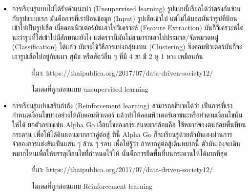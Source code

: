 \begin{itemize}[label={--}]
\item การเรียนรู้แบบไม่ได้รับคำแนะนำ (Unsupervised learning)
	      รูปแบบนี้เรียกได้ว่าตรงกันข้ามกับรูปแบบแรก มันคือการที่เราป้อนข้อมูล (Input) รูปเสือเข้าไป แต่ไม่ได้บอกมันว่ารูปที่ป้อนเข้าไปเป็นรูปเสือ เมื่อคอมพิวเตอร์มันเอาไปวิเคราะห์ (Feature Extraction) มันก็วิเคราะห์ได้นะว่ารูปที่ใส่เข้าไปมีลักษณะยังไง แต่คราวนี้มันไม่สามารถเอาไปประมวล/จัดหมวดหมู่ (Classification) ได้แล้ว มันจะใช้วิธีการแบ่งกลุ่มแทน (Clustering) ซึ่งคอมพิวเตอร์มันก็จะเอารูปเสือไปอยู่กับแมว สุนัข หรือสัตว์อื่น ๆ ที่มี 4 ขา มี 2 หู 1 หาง เหมือนกัน
				\begin{figure}[H]
					\caption{โมเดลที่ถูกสอนแบบ unsupervised learning}{ที่มา: https://thaipublica.org/2017/07/data-driven-society12/}
					\label{Fig:neural}
				\end{figure}
		\item การเรียนรู้แปบเสริมกำลัง (Reinforcement learning)
	      สามารถอธิบายได้ว่า เป็นการที่เรากำหนดเงื่อนไขบางอย่างให้กับคอมพิวเตอร์ แล้วทำให้คอมพิวเตอร์เอาชนะหรือทำตามเงื่อนไขนั้นให้ได้ ยกตัวอย่างเช่น Alpha Go เงื่อนไขของการเล่นหมากล้อมคือ ใช้หมากของตนล้อมพื้นที่บนกระดาน เพื่อให้ได้ดินแดนมากกว่าคู่ต่อสู้ ทีนี้ Alpha Go ก็จะเรียนรู้ด้วยตัวมันเองผ่านการจำลองการแข่งขันเป็นแสน ๆ ล้าน ๆ รอบ เพื่อให้รู้ว่า ถ้าหากคู่ต่อสู้เดินหมากนี้ ตัวมันเองจะเดินหมากไหนเพื่อให้บรรลุเงื่อนไขที่กำหนดไว้ให้ นั่นคือการยึดพื้นที่บนกระดานให้ได้มากที่สุด
				\begin{figure}[H]
					\caption{โมเดลที่ถูกสอนแบบ Reinforcement learning}{ที่มา: https://thaipublica.org/2017/07/data-driven-society12/}
					\label{Fig:neural}
				\end{figure}
			\end{itemize}

